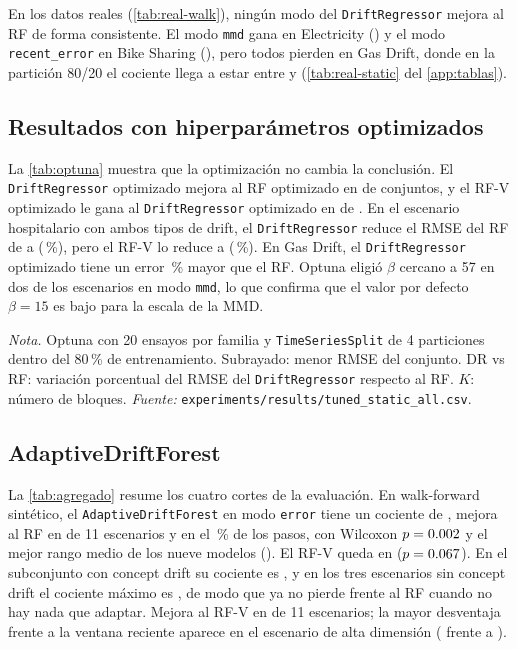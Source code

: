 \documentclass[11pt,a4paper]{article}
\newcommand{\nota}[1]{\par\smallskip\raggedright\footnotesize\textit{Nota.} #1}
\begin{document}
En los datos reales (\cref{tab:real-walk}), ningún modo del \texttt{DriftRegressor} mejora al RF de
forma consistente. El modo \texttt{mmd} gana en Electricity (\xDRmElectricityWalk) y el modo
\texttt{recent\_error} en Bike Sharing (\xDRrBikeSharingWalk), pero todos pierden en Gas Drift, donde
en la partición 80/20 el cociente llega a estar entre \gasDRmin{} y \gasDRmax{}
(\cref{tab:real-static} del \cref{app:tablas}).

\subsection{Resultados con hiperparámetros optimizados}\label{sec:res-optuna}

La \cref{tab:optuna} muestra que la optimización no cambia la conclusión. El \texttt{DriftRegressor}
optimizado mejora al RF optimizado en \optDRganaRF{} de \optN{} conjuntos, y el RF-V optimizado le gana
al \texttt{DriftRegressor} optimizado en \optRFVganaDR{} de \optN{}. En el escenario hospitalario con
ambos tipos de drift, el \texttt{DriftRegressor} reduce el RMSE del RF de \optBothRF{} a \optBothDR{}
(\optBothDRpct\,\%), pero el RF-V lo reduce a \optBothRFV{} (\optBothRFVpct\,\%). En Gas Drift, el
\texttt{DriftRegressor} optimizado tiene un error \optGasDRpct\,\% mayor que el RF. Optuna eligió
$\beta$ cercano a 57 en dos de los escenarios en modo \texttt{mmd}, lo que confirma que el valor por
defecto $\beta=15$ es bajo para la escala de la MMD.

\begin{table}[htbp]
  \centering
  \caption{RMSE en test con hiperparámetros optimizados (partición 80/20)}\label{tab:optuna}
  \small
  
  \nota{Optuna con 20 ensayos por familia y \texttt{TimeSeriesSplit} de 4 particiones dentro del
  80\,\% de entrenamiento. Subrayado: menor RMSE del conjunto. DR vs RF: variación porcentual del RMSE
  del \texttt{DriftRegressor} respecto al RF. $K$: número de bloques. \textit{Fuente:}
  \texttt{experiments/results/tuned\_static\_all.csv}.}
\end{table}

\subsection{AdaptiveDriftForest}\label{sec:res-adf}

La \cref{tab:agregado} resume los cuatro cortes de la evaluación. En walk-forward sintético, el
\texttt{AdaptiveDriftForest} en modo \texttt{error} tiene un cociente de \rADFeSintWalk{}, mejora al RF
en \gADFeSintWalk{} de 11 escenarios y en el \wADFeSintWalk\,\% de los pasos, con Wilcoxon
$p=0.002$ y el mejor rango medio de los nueve modelos (\kADFeSintWalk). El RF-V queda en
\rRFVSintWalk{} ($p=0.067$). En el subconjunto con concept drift su cociente es
\hCuatroConceptGeo{}, y en los tres escenarios sin concept drift el cociente máximo es
\hCuatroSinMax{}, de modo que ya no pierde frente al RF cuando no hay nada que adaptar. Mejora al RF-V
en \hCuatroVsRFV{} de 11 escenarios; la mayor desventaja frente a la ventana reciente aparece en el
escenario de alta dimensión (\xADFeHighdimMixedWalk{} frente a \xRFVHighdimMixedWalk).
\end{document}
